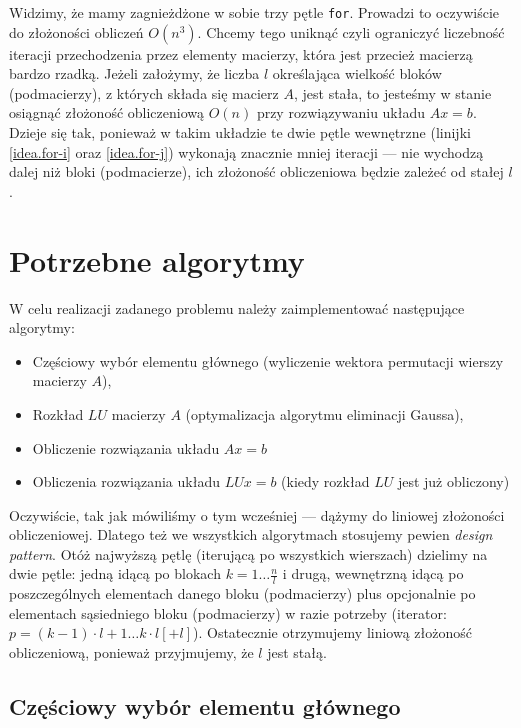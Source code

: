 \documentclass[10pt]{article}
\begin{document}
\noindent Widzimy, że mamy zagnieżdżone w sobie trzy pętle \texttt{for}. Prowadzi to oczywiście do złożoności obliczeń $O(n^3)$. Chcemy tego uniknąć czyli ograniczyć liczebność iteracji przechodzenia przez elementy macierzy, która jest przecież macierzą bardzo rzadką. Jeżeli założymy, że liczba $l$ określająca wielkość bloków (podmacierzy), z których składa się macierz $A$, jest stała, to jesteśmy w stanie osiągnąć złożoność obliczeniową $O(n)$ przy rozwiązywaniu układu $Ax = b$. Dzieje się tak, ponieważ w takim układzie te dwie pętle wewnętrzne (linijki \ref*{idea.for-i} oraz \ref*{idea.for-j}) wykonają znacznie mniej iteracji — nie wychodzą dalej niż bloki (podmacierze), ich złożoność obliczeniowa będzie zależeć od stałej $l$.

\section{Potrzebne algorytmy}

W celu realizacji zadanego problemu należy zaimplementować następujące algorytmy:
\begin{itemize}
    \item Częściowy wybór elementu głównego (wyliczenie wektora permutacji wierszy macierzy $A$),
    \item Rozkład $LU$ macierzy $A$ (optymalizacja algorytmu eliminacji Gaussa),
    \item Obliczenie rozwiązania układu $Ax = b$
    \item Obliczenia rozwiązania układu $LUx = b$ (kiedy rozkład $LU$ jest już obliczony)
\end{itemize}

Oczywiście, tak jak mówiliśmy o tym wcześniej — dążymy do liniowej złożoności obliczeniowej. Dlatego też we wszystkich algorytmach stosujemy pewien \textit{design pattern}. Otóż najwyższą pętlę (iterującą po wszystkich wierszach) dzielimy na dwie pętle: jedną idącą po blokach $k = 1 \dots \frac{n}{l}$ i drugą, wewnętrzną  idącą po poszczególnych elementach danego bloku (podmacierzy) plus opcjonalnie po elementach sąsiedniego bloku (podmacierzy) w razie potrzeby (iterator: $p = (k-1) \cdot l +1 \dots k\cdot l [+l]$). Ostatecznie otrzymujemy liniową złożoność obliczeniową, ponieważ przyjmujemy, że $l$ jest stałą.

\subsection{Częściowy wybór elementu głównego}
\end{document}
